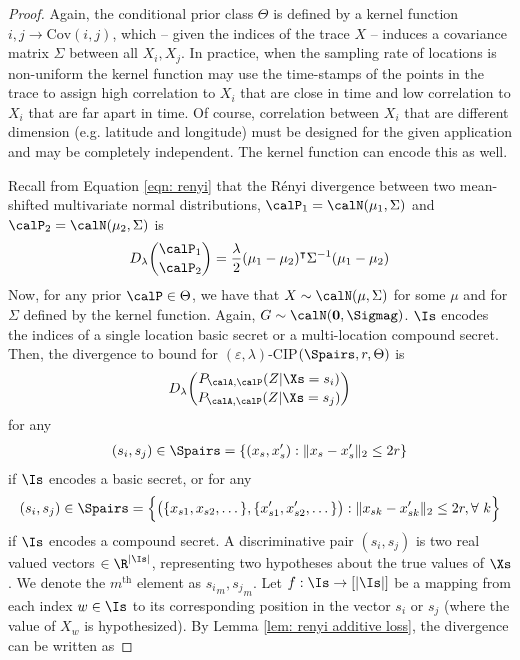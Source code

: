\begin{proof}
Again, the conditional prior class $\Theta$ is defined by a kernel function $i,j \rightarrow \text{Cov}(i,j)$, which -- given the indices of the trace $X$ -- induces a covariance matrix $\Sigma$ between all $X_i, X_j$. In practice, when the sampling rate of locations is non-uniform the kernel function may use the time-stamps of the points in the trace to assign high correlation to $X_i$ that are close in time and low correlation to $X_i$ that are far apart in time. Of course, correlation between $X_i$ that are different dimension (e.g. latitude and longitude) must be designed for the given application and may be completely independent. The kernel function can encode this as well. 

Recall from Equation \ref{eqn: renyi} that the R\'enyi divergence between two mean-shifted multivariate normal distributions, $\calP_1 = \calN(\mu_1, \Sigma)$ and $\calP_2 = \calN(\mu_2, \Sigma)$ is 
\begin{align*}
	D_\lambda \binom{\calP_1}{\calP_2} = \frac{\lambda}{2} (\mu_1 - \mu_2)^\intercal \Sigma^{-1} (\mu_1 - \mu_2)
\end{align*}
Now, for any prior $\calP \in \Theta$, we have that $X \sim \calN(\mu, \Sigma)$ for some $\mu$ and for $\Sigma$ defined by the kernel function. Again, $G \sim \calN(\mathbf{0}, \Sigmag)$. $\Is$ encodes the indices of a single location basic secret or a multi-location compound secret. Then, the divergence to bound for $(\varepsilon, \lambda)$-CIP$(\Spairs, r, \Theta)$ is 
\begin{align*}
	D_\lambda \binom{P_{\calA, \calP}(Z | \Xs = s_i)}{P_{\calA, \calP}(Z | \Xs = s_j)}
\end{align*}
for any 
\begin{align*} 
	(s_i, s_j) \in \Spairs = \{(x_s, x_s'):\|x_s - x_s'\|_2 \leq 2r\}
\end{align*}
if $\Is$ encodes a basic secret, or for any
\begin{align*}
	(s_i, s_j) \in \Spairs = \Big\{\big( \{x_{s1}, x_{s2}, \dots\}, \{x_{s1}', x_{s2}', \dots\}\big): \| x_{sk} - x_{sk}' \|_2 \leq 2r, \forall \ k\Big\} 
\end{align*} 
if $\Is$ encodes a compound secret. A discriminative pair $(s_i,s_j)$ is two real valued vectors $\in \R^{|\Is|}$, representing two hypotheses about the true values of $\Xs$. We denote the $m^\text{th}$ element as ${s_i}_m, {s_j}_m$. Let $f:\Is \rightarrow [|\Is|]$ be a mapping from each index $w \in \Is$ to its corresponding position in the vector $s_i$ or $s_j$ (where the value of $X_w$ is hypothesized). By Lemma \ref{lem: renyi additive loss}, the divergence can be written as  

\end{proof}
